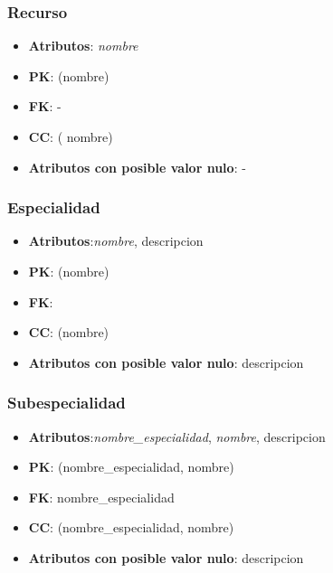 \documentclass[a4paper,11pt]{article}
\begin{document}
\subsubsection{\textbf{Recurso}}

\begin{itemize}

\item 
\textbf{Atributos}: \emph{nombre}

\item 
\textbf{PK}: (nombre)

\item
\textbf{FK}: -

\item 
\textbf{CC}: ( nombre)

\item 
\textbf{Atributos con posible valor nulo}: -

\end{itemize}
\subsubsection{\textbf{Especialidad}}

\begin{itemize}

\item 
\textbf{Atributos}:\emph{nombre}, descripcion

\item 
\textbf{PK}: (nombre)

\item
\textbf{FK}:

\item 
\textbf{CC}: (nombre)

\item 
\textbf{Atributos con posible valor nulo}: descripcion

\end{itemize}
\subsubsection{\textbf{Subespecialidad}}

\begin{itemize}

\item 
\textbf{Atributos}:\emph{nombre\_especialidad}, \emph{nombre}, descripcion

\item 
\textbf{PK}: (nombre\_especialidad, nombre)

\item
\textbf{FK}: nombre\_especialidad

\item 
\textbf{CC}: (nombre\_especialidad, nombre)

\item 
\textbf{Atributos con posible valor nulo}: descripcion

\end{itemize}
\end{document}
